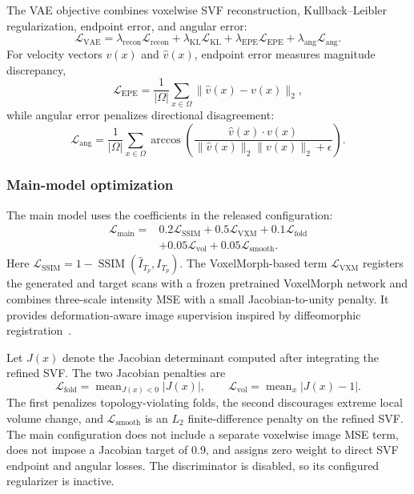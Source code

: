 The VAE objective combines voxelwise SVF reconstruction, Kullback--Leibler regularization, endpoint error, and angular error:
\begin{equation}
    \mathcal{L}_{\mathrm{VAE}}=
    \lambda_{\mathrm{recon}}\mathcal{L}_{\mathrm{recon}}+
    \lambda_{\mathrm{KL}}\mathcal{L}_{\mathrm{KL}}+
    \lambda_{\mathrm{EPE}}\mathcal{L}_{\mathrm{EPE}}+
    \lambda_{\mathrm{ang}}\mathcal{L}_{\mathrm{ang}}.
\end{equation}
For velocity vectors $v(x)$ and $\hat v(x)$, endpoint error measures magnitude discrepancy,
\begin{equation}
    \mathcal{L}_{\mathrm{EPE}}=\frac{1}{|\Omega|}
    \sum_{x\in\Omega}\|\hat v(x)-v(x)\|_2,
\end{equation}
while angular error penalizes directional disagreement:
\begin{equation}
    \mathcal{L}_{\mathrm{ang}}=\frac{1}{|\Omega|}\sum_{x\in\Omega}
    \arccos\!\left(
    \frac{\hat v(x)\cdot v(x)}{\|\hat v(x)\|_2\|v(x)\|_2+\epsilon}
    \right).
\end{equation}

\subsubsection*{Main-model optimization}

The main model uses the coefficients in the released configuration:
\begin{equation}
\begin{split}
    \mathcal{L}_{\mathrm{main}}={}&0.2\mathcal{L}_{\mathrm{SSIM}}
    +0.5\mathcal{L}_{\mathrm{VXM}}
    +0.1\mathcal{L}_{\mathrm{fold}}\\
    &+0.05\mathcal{L}_{\mathrm{vol}}
    +0.05\mathcal{L}_{\mathrm{smooth}}.
\end{split}
\end{equation}
Here $\mathcal{L}_{\mathrm{SSIM}}=1-\operatorname{SSIM}(\hat I_{T_p},I_{T_p})$. The VoxelMorph-based term $\mathcal{L}_{\mathrm{VXM}}$ registers the generated and target scans with a frozen pretrained VoxelMorph network and combines three-scale intensity MSE with a small Jacobian-to-unity penalty. It provides deformation-aware image supervision inspired by diffeomorphic registration~\cite{beg2005lddmm,dalca2018unsupervised}.

Let $J(x)$ denote the Jacobian determinant computed after integrating the refined SVF. The two Jacobian penalties are
\begin{equation}
    \mathcal{L}_{\mathrm{fold}}=\operatorname{mean}_{J(x)<0}|J(x)|,
    \qquad
    \mathcal{L}_{\mathrm{vol}}=\operatorname{mean}_{x}|J(x)-1|.
\end{equation}
The first penalizes topology-violating folds, the second discourages extreme local volume change, and $\mathcal{L}_{\mathrm{smooth}}$ is an $L_2$ finite-difference penalty on the refined SVF. The main configuration does not include a separate voxelwise image MSE term, does not impose a Jacobian target of 0.9, and assigns zero weight to direct SVF endpoint and angular losses. The discriminator is disabled, so its configured regularizer is inactive.

